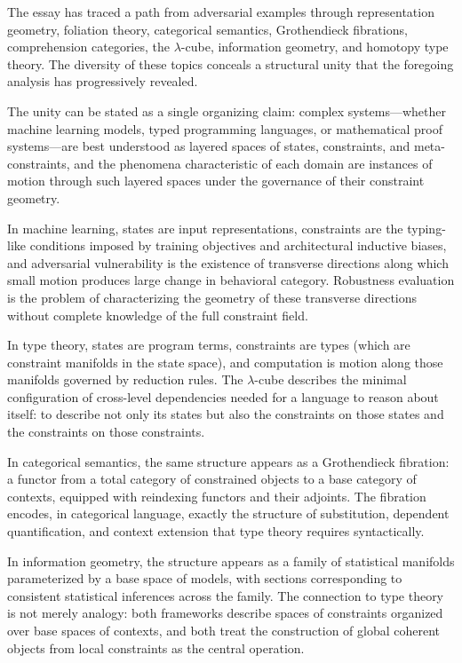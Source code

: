 \documentclass[12pt,a4paper]{article}
\theoremstyle{plain}
\theoremstyle{definition}
\begin{document}
The essay has traced a path from adversarial examples through representation geometry, foliation theory, categorical semantics, Grothendieck fibrations, comprehension categories, the $\lambda$-cube, information geometry, and homotopy type theory. The diversity of these topics conceals a structural unity that the foregoing analysis has progressively revealed.

The unity can be stated as a single organizing claim: complex systems---whether machine learning models, typed programming languages, or mathematical proof systems---are best understood as layered spaces of states, constraints, and meta-constraints, and the phenomena characteristic of each domain are instances of motion through such layered spaces under the governance of their constraint geometry.

In machine learning, states are input representations, constraints are the typing-like conditions imposed by training objectives and architectural inductive biases, and adversarial vulnerability is the existence of transverse directions along which small motion produces large change in behavioral category. Robustness evaluation is the problem of characterizing the geometry of these transverse directions without complete knowledge of the full constraint field.

In type theory, states are program terms, constraints are types (which are constraint manifolds in the state space), and computation is motion along those manifolds governed by reduction rules. The $\lambda$-cube describes the minimal configuration of cross-level dependencies needed for a language to reason about itself: to describe not only its states but also the constraints on those states and the constraints on those constraints.

In categorical semantics, the same structure appears as a Grothendieck fibration: a functor from a total category of constrained objects to a base category of contexts, equipped with reindexing functors and their adjoints. The fibration encodes, in categorical language, exactly the structure of substitution, dependent quantification, and context extension that type theory requires syntactically.

In information geometry, the structure appears as a family of statistical manifolds parameterized by a base space of models, with sections corresponding to consistent statistical inferences across the family. The connection to type theory is not merely analogy: both frameworks describe spaces of constraints organized over base spaces of contexts, and both treat the construction of global coherent objects from local constraints as the central operation.
\end{document}

